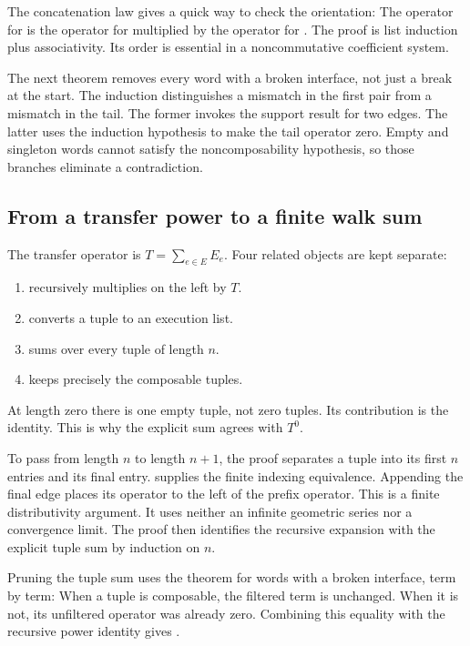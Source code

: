 The concatenation law gives a quick way to check the orientation:
The operator for  is the operator for  multiplied by the operator for . The proof is list induction plus associativity. Its order is essential in a noncommutative coefficient system.

The next theorem removes every word with a broken interface, not just a break at the start.
The induction distinguishes a mismatch in the first pair from a mismatch in the tail. The former invokes the support result for two edges. The latter uses the induction hypothesis to make the tail operator zero. Empty and singleton words cannot satisfy the noncomposability hypothesis, so those branches eliminate a contradiction.

\subsection{From a transfer power to a finite walk sum}
The transfer operator is $T=\sum_{e\in E}E_e$. Four related objects are kept separate:
\begin{enumerate}
\item {} recursively multiplies on the left by $T$.
\item {} converts a tuple  to an execution list.
\item {} sums over every tuple of length $n$.
\item {} keeps precisely the composable tuples.
\end{enumerate}
At length zero there is one empty tuple, not zero tuples. Its contribution is the identity. This is why the explicit sum agrees with $T^0$.

To pass from length $n$ to length $n+1$, the proof separates a tuple into its first $n$ entries and its final entry.  supplies the finite indexing equivalence. Appending the final edge places its operator to the left of the prefix operator.
This is a finite distributivity argument. It uses neither an infinite geometric series nor a convergence limit. The proof then identifies the recursive expansion with the explicit tuple sum by induction on $n$.

Pruning the tuple sum uses the theorem for words with a broken interface, term by term:
When a tuple is composable, the filtered term is unchanged. When it is not, its unfiltered operator was already zero. Combining this equality with the recursive power identity gives .

